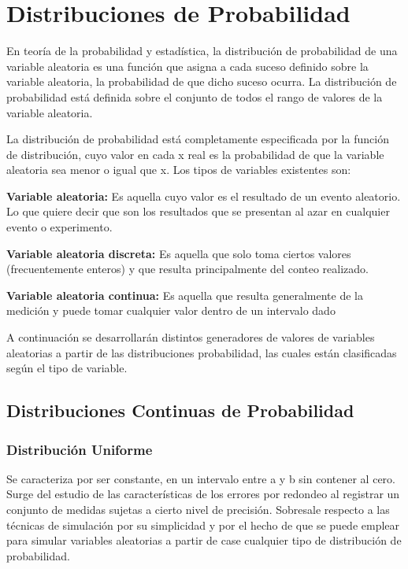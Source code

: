 \documentclass{article}
\begin{document}
  \section{Distribuciones de Probabilidad}

    En teoría de la probabilidad y estadística, la distribución de probabilidad de una variable
    aleatoria es una función que asigna a cada suceso definido sobre la variable aleatoria, la
    probabilidad de que dicho suceso ocurra. La distribución de probabilidad está definida
    sobre el conjunto de todos el rango de valores de la variable aleatoria.

    La distribución de probabilidad está completamente especificada por la función de distribución, cuyo valor en cada x
    real es la probabilidad de que la variable aleatoria sea menor o igual que x.
    Los tipos de variables existentes son:
    \item \textbf{Variable aleatoria:} Es aquella cuyo valor es el resultado de un evento aleatorio. Lo que quiere decir que son
    los resultados que se presentan al azar en cualquier evento o experimento.
    \item \textbf{Variable aleatoria discreta:} Es aquella que solo toma ciertos valores (frecuentemente enteros) y que resulta
  principalmente del conteo realizado.
    \item \textbf{Variable aleatoria continua:} Es aquella que resulta generalmente de la medición y puede tomar cualquier valor
    dentro de un intervalo dado

  A continuación se desarrollarán distintos generadores de valores de variables aleatorias a partir de las distribuciones probabilidad, las cuales están clasificadas según el tipo de variable.

  \subsection{Distribuciones Continuas de Probabilidad}
    \subsubsection{Distribución Uniforme}
  Se caracteriza por ser constante, en un intervalo entre a y b sin contener al cero. Surge del estudio de las características de los errores por redondeo al registrar un conjunto de medidas sujetas a cierto nivel de precisión.
  Sobresale respecto a las técnicas de simulación por su simplicidad y por el hecho de que se puede emplear para simular variables aleatorias a partir de case cualquier tipo de distribución de probabilidad.
\end{document}
